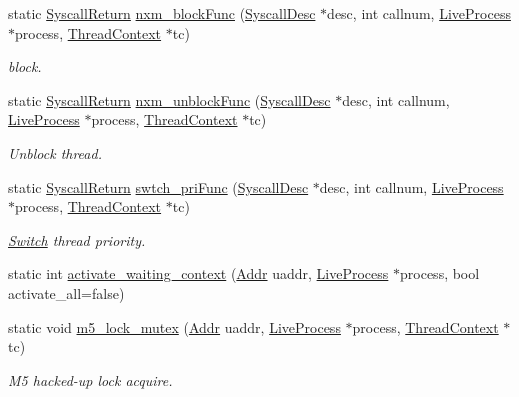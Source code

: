 \begin{DoxyCompactItemize}
static \hyperlink{classSyscallReturn}{SyscallReturn} \hyperlink{classTru64_ad497f5d8e1f57340b73ad9ea52b88dd3}{nxm\_\-blockFunc} (\hyperlink{classSyscallDesc}{SyscallDesc} $\ast$desc, int callnum, \hyperlink{classLiveProcess}{LiveProcess} $\ast$process, \hyperlink{classThreadContext}{ThreadContext} $\ast$tc)
\begin{DoxyCompactList}\small\item\em block. \item\end{DoxyCompactList}\item 
static \hyperlink{classSyscallReturn}{SyscallReturn} \hyperlink{classTru64_abdd09a9b9645e7199d23afbdae212ef6}{nxm\_\-unblockFunc} (\hyperlink{classSyscallDesc}{SyscallDesc} $\ast$desc, int callnum, \hyperlink{classLiveProcess}{LiveProcess} $\ast$process, \hyperlink{classThreadContext}{ThreadContext} $\ast$tc)
\begin{DoxyCompactList}\small\item\em Unblock thread. \item\end{DoxyCompactList}\item 
static \hyperlink{classSyscallReturn}{SyscallReturn} \hyperlink{classTru64_a447627b7d2862dbc933f4d4a4433cd4c}{swtch\_\-priFunc} (\hyperlink{classSyscallDesc}{SyscallDesc} $\ast$desc, int callnum, \hyperlink{classLiveProcess}{LiveProcess} $\ast$process, \hyperlink{classThreadContext}{ThreadContext} $\ast$tc)
\begin{DoxyCompactList}\small\item\em \hyperlink{classSwitch}{Switch} thread priority. \item\end{DoxyCompactList}\item 
static int \hyperlink{classTru64_aaef9d5f33173de4f6d2875193eb83d7a}{activate\_\-waiting\_\-context} (\hyperlink{base_2types_8hh_af1bb03d6a4ee096394a6749f0a169232}{Addr} uaddr, \hyperlink{classLiveProcess}{LiveProcess} $\ast$process, bool activate\_\-all=false)
\item 
static void \hyperlink{classTru64_a029c70f7b96e2ccaa00ea5252875de90}{m5\_\-lock\_\-mutex} (\hyperlink{base_2types_8hh_af1bb03d6a4ee096394a6749f0a169232}{Addr} uaddr, \hyperlink{classLiveProcess}{LiveProcess} $\ast$process, \hyperlink{classThreadContext}{ThreadContext} $\ast$tc)
\begin{DoxyCompactList}\small\item\em M5 hacked-\/up lock acquire. \item\end{DoxyCompactList}\item 

\end{DoxyCompactItemize}
